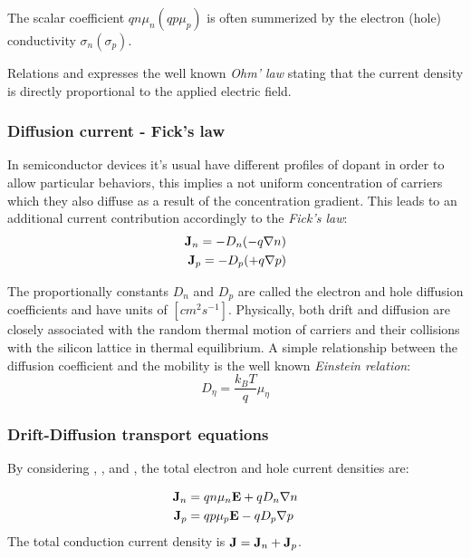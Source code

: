 The scalar coefficient $qn\mu_n(qp\mu_p)$ is often summerized by the electron (hole) conductivity $\sigma_n(\sigma_p)$. 

Relations  and  expresses the well known \textit{Ohm' law} stating that the current density is directly proportional to the applied electric field.


\subsubsection{Diffusion current - Fick's law}

In semiconductor devices it's usual have different profiles of dopant in order to allow particular behaviors, this implies a not uniform concentration of carriers which they also diffuse as a result of the concentration gradient. This leads to an additional current contribution accordingly to the \textit{Fick's law}:
\begin{align}
\mathbf{J}_n = -D_n(-q\nabla n) \label{eq: diff electron}\\
\mathbf{J}_p = -D_p(+q\nabla p) \label{eq: diff hole}
\end{align}

The proportionally constants $D_n$ and $D_p$ are called the electron and hole diffusion coefficients and have units of $[cm^2s^{-1}]$. Physically, both drift and diffusion are closely associated with the random thermal motion of carriers and their collisions with the silicon lattice in thermal equilibrium. A simple relationship between the diffusion coefficient and the mobility is the well known \textit{Einstein relation}:
\begin{equation}
D_\eta = \dfrac{k_BT}{q}\mu_\eta
\end{equation}

\subsubsection{Drift-Diffusion transport equations}
\label{subsub:driftdiffusion transport}

By considering , ,  and , the total electron and hole current densities are:

\begin{align}
\mathbf{J}_n &= qn\mu_n\mathbf{E} + qD_n\nabla n  \label{eq: drift diff electron}\\ 
\mathbf{J}_p &= qp\mu_p\mathbf{E} - qD_p \nabla p \label{eq: drift diff hole}
\end{align}
The total conduction current density is $\mathbf{J}=\mathbf{J}_n+\mathbf{J}_p$.

